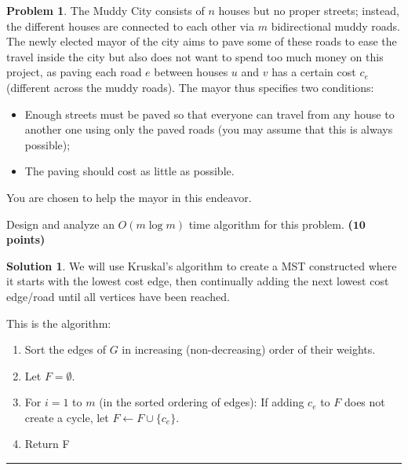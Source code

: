 \documentclass{article}
\theoremstyle{definition}
\newtheorem{problem}{Problem}
\def\fline{\rule{0.75\linewidth}{0.5pt}}
\newcommand{\finishline}{\begin{center}\fline\end{center}}
\newtheorem*{solution*}{Solution}
\newenvironment{solution}{\begin{solution*}}{{\finishline} \end{solution*}}
\newcommand{\grade}[1]{\hfill{\textbf{($\mathbf{#1}$ points)}}}
\begin{document}
\begin{problem}
	The Muddy City consists of $n$ houses but no proper streets; instead, the different houses are connected to each other via $m$ bidirectional muddy roads. The newly elected mayor of the city aims to pave some of these roads to ease
	the travel inside the city but also does not want to spend too much money on this project, as paving each road $e$ between houses $u$ and $v$ has a certain cost $c_e$ (different across the muddy roads). The mayor thus specifies two conditions: 
	\begin{itemize}
		\item Enough streets must be paved so that everyone can travel from any house to another one using only the paved roads (you may assume that this is always possible); 
		\item The paving should cost as little as possible. 
	\end{itemize}
	You are chosen to help the mayor in this endeavor.  
	
	\begin{enumerate}
		\item [(a)] Design and analyze an $O(m\log{m})$ time algorithm for this problem. \grade{10} 
		
		\medskip

\begin{solution}
\item We will use Kruskal's algorithm to create a MST constructed where it starts with the lowest cost edge, then continually adding the next lowest cost edge/road until all vertices have been reached. 
\item This is the algorithm:
\begin{enumerate}
\item Sort the edges of $G$ in increasing (non-decreasing) order of their weights.
\item Let $F = \emptyset$.
\item For $i = 1$ to $m$ (in the sorted ordering of edges): If adding $c_e$ to $F$ does not create a cycle, let $F \leftarrow F \cup \{c_e\}$.
\item Return F
\end{enumerate}


\end{solution}
\end{enumerate}
\end{problem}
\end{document}

